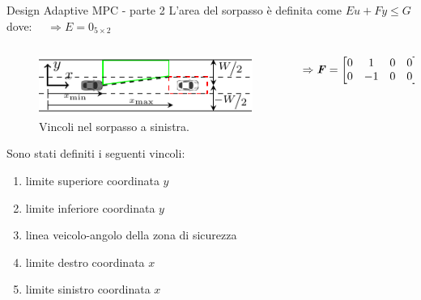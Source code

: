 \documentclass{beamer}
\renewcommand{\vec}[1]{\ensuremath{\boldsymbol{\mathit{#1}}}}
\begin{document}
	\begin{frame}{Design Adaptive MPC - parte 2} %
		\hspace{-2em}
		{\vspace{5em} L'area del sorpasso è definita come $\vec{E}\vec{u}+\vec{F}\vec{y}\leq \vec{G}$ dove: $\quad\Rightarrow\vec{E}=\vec{0}_{5\times2}$}
		\begin{columns}[onlytextwidth,T]
			\hspace{-1.5em}
			\begin{column}[c]{0.73\textwidth}
				\vspace{-5.6em}
				\begin{figure}[!t]
					\centering
					\includegraphics[width=0.9\columnwidth]{./images/constraint/constraint.pdf}
					\caption{Vincoli nel sorpasso a sinistra.}
					\label{fig:constraint}
				\end{figure}
				\vspace{-0.8em}
				\hspace{-0.5em} Sono stati definiti i seguenti vincoli:
				\begin{enumerate}
				\item limite superiore coordinata $y$
				\item limite inferiore coordinata $y$
				\item linea veicolo-angolo della zona di sicurezza
				\item limite destro coordinata $x$
				\item limite sinistro coordinata $x$
				\end{enumerate}
			\end{column}
			\begin{column}[c]{0.34\textwidth}
				\vspace{-6em}
				\begin{equation*}
				\begin{array}{lll}
				\hspace{-0.5em}\Rightarrow\vec{F}=\begin{bmatrix}
				0&1&0&0\\
				0&-1&0&0\\

\end{bmatrix}
\end{array}
\end{equation*}
\end{column}
\end{columns}
\end{frame}
\end{document}

